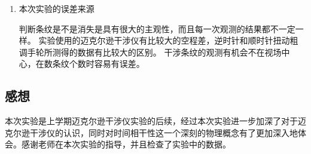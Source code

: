 \documentclass[a4paper]{article}
\begin{document}
\begin{changemargin}{1cm}{1cm}
\begin{spacing}{1.6}
\begin{enumerate}
            \item 本次实验的误差来源

                  判断条纹是不是消失是具有很大的主观性，而且每一次观测的结果都不一定一样。
                  实验使用的迈克尔逊干涉仪有比较大的空程差，逆时针和顺时针扭动粗调手轮所测得的数据有比较大的区别。
                  干涉条纹的观测有机会不在视场中心，在数条纹个数时容易有误差。
        \end{enumerate}
    \end{spacing}
    \subsection{感想}
    \begin{spacing}{1.6}
        本次实验是上学期迈克尔逊干涉仪实验的后续，经过本次实验进一步加深了对于迈克尔逊干涉仪的认识，同时对时间相干性这一个深刻的物理概念有了更加深入地体会。感谢老师在本次实验的指导，并且检查了实验中的数据。
    \end{spacing}










\end{changemargin}
\end{document}
